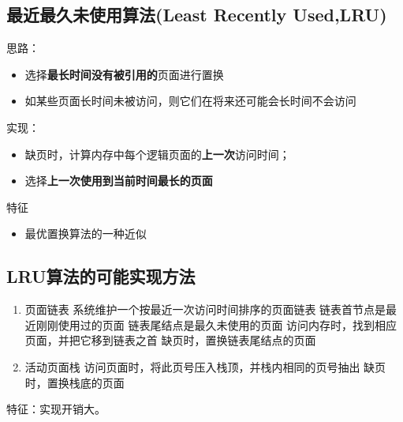\subsection{最近最久未使用算法(Least Recently Used,LRU)}
思路：
\begin{itemize}
	\item 选择\textbf{最长时间没有被引用的}页面进行置换
	\item 如某些页面长时间未被访问，则它们在将来还可能会长时间不会访问
\end{itemize}
实现：
\begin{itemize}
	\item 缺页时，计算内存中每个逻辑页面的\textbf{上一次}访问时间；
	\item 选择\textbf{上一次使用到当前时间最长的页面}
\end{itemize}
特征
\begin{itemize}
	\item 最优置换算法的一种近似
\end{itemize}
\subsection{LRU算法的可能实现方法}
\begin{enumerate}
	\item 页面链表
	\subitem 系统维护一个按最近一次访问时间排序的页面链表
	\subsubitem 链表首节点是最近刚刚使用过的页面
	\subsubitem 链表尾结点是最久未使用的页面
	\subitem 访问内存时，找到相应页面，并把它移到链表之首
	\subitem 缺页时，置换链表尾结点的页面
	\item 活动页面栈
	\subitem 访问页面时，将此页号压入栈顶，并栈内相同的页号抽出
	\subitem 缺页时，置换栈底的页面
\end{enumerate}
特征：实现开销大。
